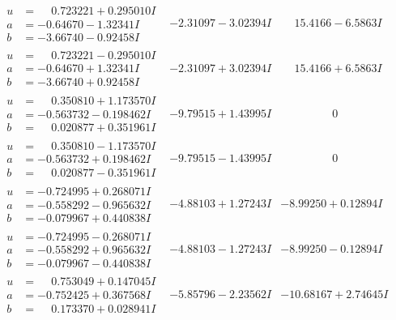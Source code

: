 \documentclass[1p]{elsarticle_modified}
\theoremstyle{definition}
\begin{document}
$$\begin{array}{c|c|c}
\begin{aligned}
u &= \phantom{-}0.723221 + 0.295010 I \\
a &= -0.64670 - 1.32341 I \\
b &= -3.66740 - 0.92458 I\end{aligned}
 & -2.31097 - 3.02394 I & \phantom{-}15.4166 - 6.5863 I \\ \hline\begin{aligned}
u &= \phantom{-}0.723221 - 0.295010 I \\
a &= -0.64670 + 1.32341 I \\
b &= -3.66740 + 0.92458 I\end{aligned}
 & -2.31097 + 3.02394 I & \phantom{-}15.4166 + 6.5863 I \\ \hline\begin{aligned}
u &= \phantom{-}0.350810 + 1.173570 I \\
a &= -0.563732 - 0.198462 I \\
b &= \phantom{-}0.020877 + 0.351961 I\end{aligned}
 & -9.79515 + 1.43995 I & \phantom{-0.000000 } 0 \\ \hline\begin{aligned}
u &= \phantom{-}0.350810 - 1.173570 I \\
a &= -0.563732 + 0.198462 I \\
b &= \phantom{-}0.020877 - 0.351961 I\end{aligned}
 & -9.79515 - 1.43995 I & \phantom{-0.000000 } 0 \\ \hline\begin{aligned}
u &= -0.724995 + 0.268071 I \\
a &= -0.558292 - 0.965632 I \\
b &= -0.079967 + 0.440838 I\end{aligned}
 & -4.88103 + 1.27243 I & -8.99250 + 0.12894 I \\ \hline\begin{aligned}
u &= -0.724995 - 0.268071 I \\
a &= -0.558292 + 0.965632 I \\
b &= -0.079967 - 0.440838 I\end{aligned}
 & -4.88103 - 1.27243 I & -8.99250 - 0.12894 I \\ \hline\begin{aligned}
u &= \phantom{-}0.753049 + 0.147045 I \\
a &= -0.752425 + 0.367568 I \\
b &= \phantom{-}0.173370 + 0.028941 I\end{aligned}
 & -5.85796 - 2.23562 I & -10.68167 + 2.74645 I \\ \hline\begin{aligned}

\end{aligned}
\end{array}$$
\end{document}
